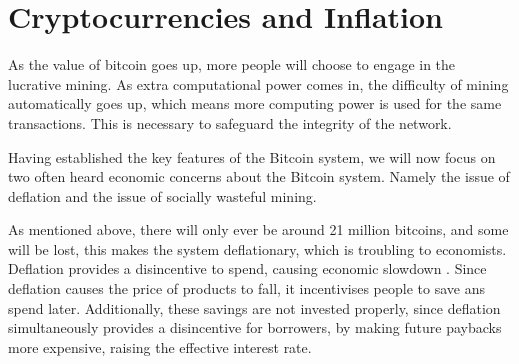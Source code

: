 
\chapter{Cryptocurrencies and Inflation}

As the value of bitcoin goes up, more people will choose to engage
in the lucrative mining. As extra computational power comes in, the
difficulty of mining automatically goes up, which means more computing
power is used for the same transactions. This is necessary to safeguard
the integrity of the network.

Having established the key features of the Bitcoin system, we will
now focus on two often heard economic concerns about the Bitcoin system.
Namely the issue of deflation and the issue of socially wasteful mining.

As mentioned above, there will only ever be around 21 million bitcoins,
and some will be lost, this makes the system deflationary, which is
troubling to economists. Deflation provides a disincentive to spend,
causing economic slowdown \citep[see e.g.][]{fisher1933debt}. Since
deflation causes the price of products to fall, it incentivises people
to save ans spend later. Additionally, these savings are not invested
properly, since deflation simultaneously provides a disincentive for
borrowers, by making future paybacks more expensive, raising the effective
interest rate.
